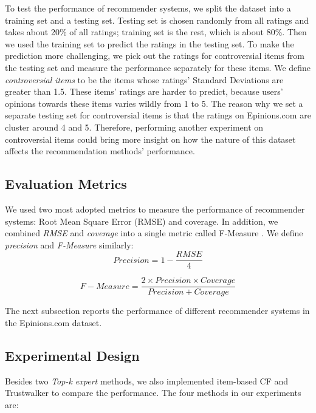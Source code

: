 \documentclass[12pt]{article}
\begin{document}
To test the performance of recommender systems, we split the dataset into a training set and a testing set. Testing set is chosen randomly from all ratings and takes about 20\% of all ratings; training set is the rest, which is about 80\%. Then we used the training set to predict the ratings in the testing set. To make the prediction more challenging, we pick out the ratings for controversial items from the testing set and measure the performance separately for these items. We define \emph{controversial items} to be the items whose ratings' Standard Deviations are greater than 1.5. These items' ratings are harder to predict, because users' opinions towards these items varies wildly from 1 to 5. The reason why we set a separate testing set for controversial items is that the ratings on Epinions.com are cluster around 4 and 5. Therefore, performing another experiment on controversial items could bring more insight on how the nature of this dataset affects the recommendation methods' performance. 


\subsection{Evaluation Metrics}

We used two most adopted metrics to measure the performance of recommender systems: Root Mean Square Error (RMSE) and coverage. In addition, we combined \emph{RMSE} and \emph{coverage} into a single metric called F-Measure \cite{Jamali:2009p67}. We define \emph{precision} and \emph{F-Measure} similarly:
\begin{equation}
Precision = 1 - \frac{RMSE}{4}
\end{equation}

\begin{equation}
F-Measure = \frac{2 \times Precision \times Coverage}{Precision + Coverage}
\end{equation}

The next subsection reports the performance of different recommender systems in the Epinions.com dataset. 


\subsection{Experimental Design}
Besides two \emph{Top-k expert} methods, we also implemented item-based CF and Trustwalker to compare the performance. The four methods in our experiments are:
\end{document}
